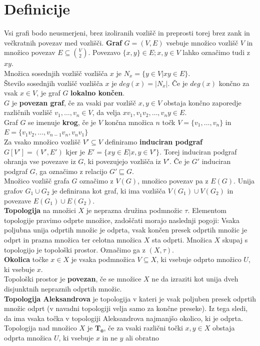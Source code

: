 \documentclass[a4paper, 12pt]{book}
\theoremstyle{definition}
\begin{document}
\section{Definicije}
Vsi grafi bodo neusmerjeni, brez izoliranih vozlišč in preprosti torej brez zank
in večkratnih povezav med vozlišči.
\textbf{Graf} $G = (V,E)$ vsebuje množico vozlišč $V$ in množico povezav $E \subseteq \binom{V}{2}$.
Povezavo $\{x,y\} \in E; x,y \in V$ lahko označimo tudi z $xy$.\\
Množica sosednjih vozlišč vozlišča $x$ je $N_x = \{y \in V | xy \in E\}$.\\
Število sosednjih vozlišč vozlišča $x$ je $deg(x) = |N_x|$. Če je $deg(x)$ končno
za vsak $x \in V$, je graf $G$ \textbf{lokalno končen}.\\
$G$ je \textbf{povezan graf}, če za vsaki par vozlišč $x,y \in V$ obstaja končno
zaporedje različnih vozlišč $v_1,\dots,v_n \in V$, da velja $xv_1, v_1v_2, \dots, v_n y \in E$.\\
Graf $G$ se imenuje \textbf{krog}, če je $V$ končna množica $n$ točk $V=\{v_1,\dots,v_n\}$ in
$E=\{v_1 v_2,\dots,v_{n-1}v_n,v_n v_1\}$ \\
Za vsako množico vozlišč $V' \subseteq V$ definiramo \textbf{induciran podgraf} $G[V'] = (V',E')$
kjer je $E' = \{xy \in E | x,y \in V'\}$. Torej induciran podgraf ohranja vse povezave
iz $G$, ki povezujejo vozlišča iz $V'$. Če je $G'$ induciran podgraf $G$,
ga označimo z relacijo $G' \sqsubseteq  G$.\\
Množico vozlišč grafa $G$ označimo z $V(G)$, množico povezav pa z $E(G)$. Unija
grafov $G_1 \cup G_2$ je definirana kot graf, ki ima vozlišča $V(G_1) \cup V(G_2)$
in povezave $E(G_1) \cup E(G_2)$.\\
\textbf{Topologija} na množici $X$ je neprazna družina podmnožic $\tau$.
Elementom topologije pravimo odprte množice, zadoščati morajo naslednji pogoji:
Vsaka poljubna unija odprtih množic je odprta, vsak končen presek odprtih množic je odprt
in prazna množica ter celotna množica $X$ sta odprti. Množica $X$ skupaj s topologijo
je topološki prostor. Označimo ga z $(X,\tau)$.\\
\textbf{Okolica} točke $x \in X$ je vsaka podmnožica $V \subseteq X$, ki vsebuje
odprto množico $U$, ki vsebuje $x$.\\
Topološki prostor je \textbf{povezan}, če se množice $X$ ne da izraziti kot unija
dveh disjunktnih nepraznih odprtih množic.\\
\textbf{Topologija Aleksandrova} je topologija v kateri je vsak poljuben presek odprtih
množic odprt (v navadni topologiji velja samo za končne preseke). Iz tega sledi,
da ima vsaka točka v topologiji Aleksandrova najmanjšo okolico, ki je odprta.\\
Topologija nad množico $X$ je $\mathbf{T_0}$, če za vsaki različni točki $x,y \in X$
obstaja odprta množica $U$, ki vsebuje $x$ in ne $y$ ali obratno
\end{document}
